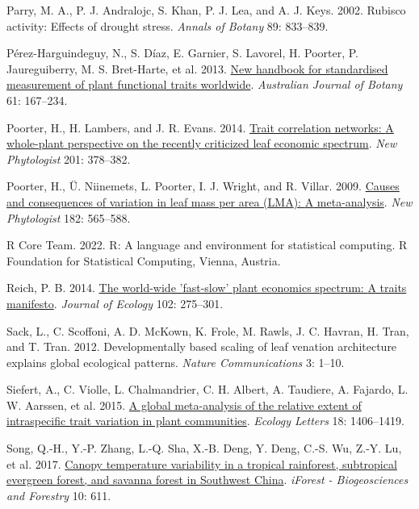 \documentclass[
  12pt,
  a4paper,
,tablecaptionabove
]{scrartcl}
\newlength{\cslhangindent}
\newenvironment{CSLReferences}[2] %
 {%
  \setlength{\parindent}{0pt}
  \ifodd #1 \everypar{\setlength{\hangindent}{\cslhangindent}}\ignorespaces\fi
  \ifnum #2 > 0
  \setlength{\parskip}{#2\baselineskip}
  \fi
 }%
 {}
\begin{document}
\begin{CSLReferences}{1}{0}
\leavevmode{}%
Parry, M. A., P. J. Andralojc, S. Khan, P. J. Lea, and A. J. Keys. 2002. Rubisco activity: Effects of drought stress. \emph{Annals of Botany} 89: 833--839.

\leavevmode{}%
Pérez-Harguindeguy, N., S. Díaz, E. Garnier, S. Lavorel, H. Poorter, P. Jaureguiberry, M. S. Bret-Harte, et al. 2013. \href{https://doi.org/10.1071/BT12225}{New handbook for standardised measurement of plant functional traits worldwide}. \emph{Australian Journal of Botany} 61: 167--234.

\leavevmode{}%
Poorter, H., H. Lambers, and J. R. Evans. 2014. \href{https://doi.org/10.1111/nph.12547}{Trait correlation networks: {A} whole-plant perspective on the recently criticized leaf economic spectrum}. \emph{New Phytologist} 201: 378--382.

\leavevmode{}%
Poorter, H., Ü. Niinemets, L. Poorter, I. J. Wright, and R. Villar. 2009. \href{https://doi.org/10.1111/j.1469-8137.2009.02830.x}{Causes and consequences of variation in leaf mass per area ({LMA}): {A} meta-analysis}. \emph{New Phytologist} 182: 565--588.

\leavevmode{}%
R Core Team. 2022. R: {A} language and environment for statistical computing. {R Foundation for Statistical Computing}, {Vienna, Austria}.

\leavevmode{}%
Reich, P. B. 2014. \href{https://doi.org/10.1111/1365-2745.12211}{The world-wide 'fast-slow' plant economics spectrum: {A} traits manifesto}. \emph{Journal of Ecology} 102: 275--301.

\leavevmode{}%
Sack, L., C. Scoffoni, A. D. McKown, K. Frole, M. Rawls, J. C. Havran, H. Tran, and T. Tran. 2012. Developmentally based scaling of leaf venation architecture explains global ecological patterns. \emph{Nature Communications} 3: 1--10.

\leavevmode{}%
Siefert, A., C. Violle, L. Chalmandrier, C. H. Albert, A. Taudiere, A. Fajardo, L. W. Aarssen, et al. 2015. \href{https://doi.org/10.1111/ele.12508}{A global meta-analysis of the relative extent of intraspecific trait variation in plant communities}. \emph{Ecology Letters} 18: 1406--1419.

\leavevmode{}%
Song, Q.-H., Y.-P. Zhang, L.-Q. Sha, X.-B. Deng, Y. Deng, C.-S. Wu, Z.-Y. Lu, et al. 2017. \href{https://doi.org/10.3832/ifor2223-010}{Canopy temperature variability in a tropical rainforest, subtropical evergreen forest, and savanna forest in {Southwest China}}. \emph{iForest - Biogeosciences and Forestry} 10: 611.


\end{CSLReferences}
\end{document}
